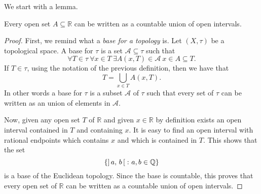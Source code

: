 \documentclass[../EserciziIstituzioniAnalisi.tex]{subfiles}
\begin{document}
We start with a lemma.
\begin{lemma}
  Every open set $A \subseteq \mathbb{R}$ can be written as a countable union of open intervals.
\end{lemma}
\begin{proof}
  First, we remind what a \textit{base for a topology} is.
  Let $(X,\tau)$ be a topological space. 
  A base for $\tau$ is a set $\mathcal{A} \subseteq \tau$ such that
  \begin{equation*}
    \forall T \in \tau \ \forall x \in T \ \exists A(x,T) \in \mathcal{A}\ x \in A \subseteq T.
  \end{equation*}
  If $T \in \tau$, using the notation of the previous definition, then we have that
  \begin{equation*}
    T = \bigcup_{x \in T} A(x,T).
  \end{equation*}
  In other words a base for $\tau$ is a subset $\mathcal{A}$ of $\tau$ such that every set of $\tau$ can be written as an union of elements in $\mathcal{A}$.

  Now, given any open set $T$ of $\mathbb{R}$ and given $x \in \mathbb{R}$ by definition exists an open interval contained in $T$ and containing $x$.
  It is easy to find an open interval with rational endpoints which contains $x$ and which is contained in $T$.
  This shows that the set
  \begin{equation*}
    \left\lbrace \left]\,a,\,b\,\right[\colon a, b \in \mathbb{Q} \right\rbrace
  \end{equation*}
  is a base of the Euclidean topology.
  Since the base is countable, this proves that every open set of $\mathbb{R}$ can be written as a countable union of open intervals.
\end{proof}
\end{document}
